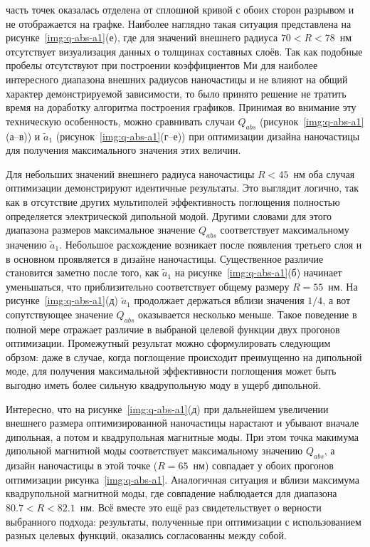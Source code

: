 часть точек оказалась отделена от сплошной кривой с обоих сторон
разрывом и не отображается на графке.  Наиболее наглядно такая
ситуация представлена на рисунке~\ref{img:q-abs-a1}(е), где для
значений внешнего радиуса $70<R<78$~нм отсутствует визуализация данных
о толщинах составных слоёв.  Так как подобные пробелы отсутствуют при
построении коэффициентов Ми для наиболее интересного диапазона внешних
радиусов наночастицы и не влияют на общий характер демонстрируемой
зависимости, то было принято решение не тратить время на доработку
алгоритма построения графиков.  Принимая во внимание эту техническую
особенность, можно сравнивать случаи $Q_{abs}$
(рисунок~\ref{img:q-abs-a1}(а--в)) и $\tilde{a}_1$
(рисунок~\ref{img:q-abs-a1}(г--е)) при оптимизации дизайна наночастицы
для получения максимального значения этих величин.

Для небольших значений внешнего радиуса наночастицы $R<45$~нм оба
случая оптимизации демонстрируют идентичные результаты. Это выглядит
логично, так как в отсутствие других мультиполей эффективность
поглощения полностью определяется электрической дипольной
модой. Другими словами для этого диапазона размеров максимальное
значение $Q_{abs}$ соответствует максимальному значению
$\tilde{a}_1$. Небольшое расхождение возникает после появления
третьего слоя и в основном проявляется в дизайне наночастицы.
Существенное различие становится заметно после того, как $\tilde{a}_1$
на рисунке~\ref{img:q-abs-a1}(б) начинает уменьшаться, что
приблизительно соответствует общему размеру $R=55$~нм. На
рисунке~\ref{img:q-abs-a1}(д) $\tilde{a}_1$ продолжает держаться
вблизи значения $1/4$, а вот сопутствующее значение $Q_{abs}$
оказывается несколько меньше. Такое поведение в полной мере отражает
различие в выбраной целевой функции двух прогонов
оптимизации. Промежутный результат можно сформулировать следующим
обрзом: даже в случае, когда поглощение происходит преимущенно на
дипольной моде, для получения максимальной эффективности поглощения
может быть выгодно иметь более сильную квадрупольную моду в ущерб
дипольной.

Интересно, что на рисунке~\ref{img:q-abs-a1}(д) при дальнейшем
увеличении внешнего размера оптимизированной наночастицы нарастают и
убывают вначале дипольная, а потом и квадрупольная магнитные моды. При
этом точка макимума дипольной магнитной моды соответствует
максимальному значению $Q_{abs}$, а дизайн наночастицы в этой точке
($R=65$~нм) совпадает у обоих прогонов оптимизации
рисунка~\ref{img:q-abs-a1}.  Аналогичная ситуация и вблизи максимума
квадрупольной магнитной моды, где совпадение наблюдается для диапазона
$80.7<R<82.1$~нм.  Всё вместе это ещё раз свидетельствует о верности
выбранного подхода: результаты, полученные при оптимизации с
использованием разных целевых функций, оказались согласованны между
собой.






